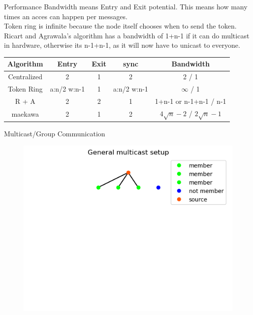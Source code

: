 \documentclass[aspectratio=1610,17pt,utf8]{beamer}
\begin{document}
\begin{frame}{Performance}
    Bandwidth means Entry and Exit potential. This means how many times an acces can happen per messages.\\
    Token ring is infinite because the node itself chooses when to send the token.\\
    Ricart and Agrawala's algorithm has a bandwidth of 1+n-1 if it can do multicast in hardware, otherwise its n-1+n-1, as it will now have to unicast to everyone.
    \tiny{\begin{table}
        \begin{tabular}{|c|c|c|c|c|}
            \hline
            Algorithm & Entry & Exit & sync & Bandwidth \\\hline
            Centralized & 2 & 1 & 2 & 2 / 1 \\\hline
            Token Ring & a:n/2 w:n-1 & 1 & a:n/2 w:n-1 & $\infty$ / 1 \\\hline
            R + A & 2 & 2 & 1 & 1+n-1 or n-1+n-1 / n-1 \\\hline
            maekawa & 2 & 1 & 2 & $4 \sqrt{n}-2$ / $2 \sqrt{n}-1$ \\\hline
        \end{tabular}
    \end{table}}
\end{frame}

\begin{frame}{Multicast/Group Communication}

    \begin{figure}
        \includegraphics[width=1\textwidth]{figures/2-multicast-group.png}
    \end{figure}
\end{frame}
\end{document}
